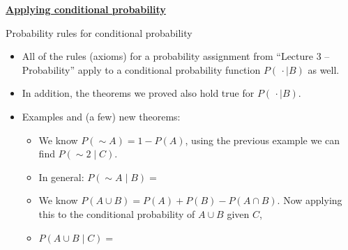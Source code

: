 \documentclass{article}
\newcommand{\bu}[1]{\textbf{\ul{#1}}}			%
\newcommand{\comp}{{\sim}}						%
\begin{document}
\newpage

\bu{Applying conditional probability}\bigskip

Probability rules for conditional probability\bigskip
\begin{itemize}
    \item All of the rules (axioms) for a probability assignment from ``Lecture 3 -- Probability'' apply to a conditional probability function $P(\,\cdot \mid B)$ as well.
    \item In addition, the theorems we proved also hold true for $P(\,\cdot \mid B)$.\bigskip
    \item Examples and (a few) new theorems:\bigskip
    	\begin{itemize}
             \item We know $P(\comp A) = 1 - P(A)$, using the previous example we can find $P(\comp 2 \mid C)$.\vspace{50pt}
             \item[] In general: $P(\comp{A} \mid B) = $\\
             \item We know $P(A \cup B) = P(A) + P(B) - P(A \cap B)$. Now applying this to the conditional probability of $A \cup B$ given $C$,\bigskip
             \item[] $P(A \cup B \mid C) = $\bigskip
         \end{itemize}
\end{itemize}\bigskip
\end{document}
